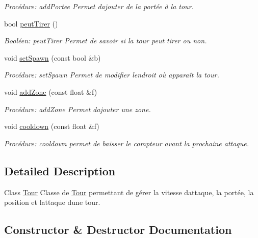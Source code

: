 \begin{DoxyCompactItemize}
\begin{DoxyCompactList}\small\item\em Procédure\+: add\+Portee Permet d\textquotesingle{}ajouter de la portée à la tour. \end{DoxyCompactList}\item 
bool \hyperlink{classTour_ab9f95f1a87befc1c47c5904c7dba213e}{peut\+Tirer} ()
\begin{DoxyCompactList}\small\item\em Booléen\+: peut\+Tirer Permet de savoir si la tour peut tirer ou non. \end{DoxyCompactList}\item 
void \hyperlink{classTour_a896b0ab5f8a022d7deb6d599de8d4642}{set\+Spawn} (const bool \&b)
\begin{DoxyCompactList}\small\item\em Procédure\+: set\+Spawn Permet de modifier l\textquotesingle{}endroit où apparaît la tour. \end{DoxyCompactList}\item 
void \hyperlink{classTour_a6c3050640d16281913269f73af884ad6}{add\+Zone} (const float \&f)
\begin{DoxyCompactList}\small\item\em Procédure\+: add\+Zone Permet d\textquotesingle{}ajouter une zone. \end{DoxyCompactList}\item 
void \hyperlink{classTour_a6ba02ec8874bcce13e97837da971f29e}{cooldown} (const float \&f)
\begin{DoxyCompactList}\small\item\em Procédure\+: cooldown permet de baisser le compteur avant la prochaine attaque. \end{DoxyCompactList}\end{DoxyCompactItemize}


\subsection{Detailed Description}
Class \hyperlink{classTour}{Tour} Classe de \hyperlink{classTour}{Tour} permettant de gérer la vitesse d\textquotesingle{}attaque, la portée, la position et l\textquotesingle{}attaque d\textquotesingle{}une tour. 

\subsection{Constructor \& Destructor Documentation}
\mbox{\label{classTour_a85e0f0e2346d1e42a09a80c1cd6d19c4}} 
